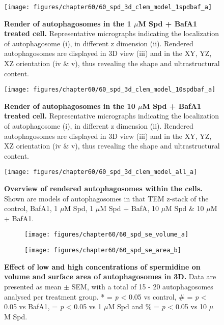\begin{figure}[!htbp]
\center
  \texttt{[image: figures/chapter60/60\_spd\_3d\_clem\_model\_1spdbaf\_a]}
  \caption[Render of autophagosomes in the 1 $\mu$M Spd  + BafA1 treated cell]{\textbf{Render of autophagosomes in the 1 $\mu$M Spd  + BafA1 treated cell.} Representative micrographs indicating the localization of autophagosome (i), in different z dimension (ii). Rendered autophagosomes are displayed in 3D view (iii) and in the XY, YZ, XZ orientation  (iv \& v), thus revealing the shape and ultrastructural content.}
  \label{fig:60_spd_3d_clem_model_1spdbaf_a}
\end{figure} 

\begin{figure}[!htbp]
\center
  \texttt{[image: figures/chapter60/60\_spd\_3d\_clem\_model\_10spdbaf\_a]}
  \caption[Render of autophagosomes in the 10 $\mu$M Spd  + BafA1 treated cell]{\textbf{Render of autophagosomes in the 10 $\mu$M Spd  + BafA1 treated cell.} Representative micrographs indicating the localization of autophagosome (i), in different z dimension (ii). Rendered autophagosomes are displayed in 3D view (iii) and in the XY, YZ, XZ orientation  (iv \& v), thus revealing the shape and ultrastructural content.}
  \label{fig:60_spd_3d_clem_model_10spdbaf_a}
\end{figure} 

\begin{landscape}
\begin{figure}[!htbp]
\center
  \texttt{[image: figures/chapter60/60\_spd\_3d\_clem\_model\_all\_a]}
  \caption[Overview of rendered autophagosomes within the cells]{\textbf{Overview of rendered autophagosomes within the cells.} Shown are models of autophagosomes in that TEM z-stack of the control, BafA1, 1 $\mu$M Spd, 1 $\mu$M Spd + BafA, 10 $\mu$M Spd \& 10 $\mu$M + BafA1.}
  \label{fig:60_spd_3d_clem_model_all_a}
\end{figure} 
\end{landscape}

\begin{figure}[!htbp]
  \begin{subfigure}[b]{0.495\linewidth}
    \texttt{[image: figures/chapter60/60\_spd\_se\_volume\_a]}
  \end{subfigure}
  \begin{subfigure}[b]{0.495\linewidth}
    \texttt{[image: figures/chapter60/60\_spd\_se\_area\_b]}
  \end{subfigure}
    \caption[Effect of low and high concentrations of spermidine on volume and surface area of autophagosomes in 3D]{\textbf{Effect of low and high concentrations of spermidine on volume and surface area of autophagosomes in 3D.} Data are presented as mean $\pm$ SEM, with a total of 15 - 20 autophagosomes analysed per treatment group. * = \textit{p} < 0.05 vs control, \# = \textit{p} < 0.05 vs BafA1, \@ = \textit{p} < 0.05 vs 1 $\mu$M Spd and \% = \textit{p} < 0.05 vs 10 $\mu$M Spd.}
  \label{fig:60_spd_se_volume_a}
\end{figure}

